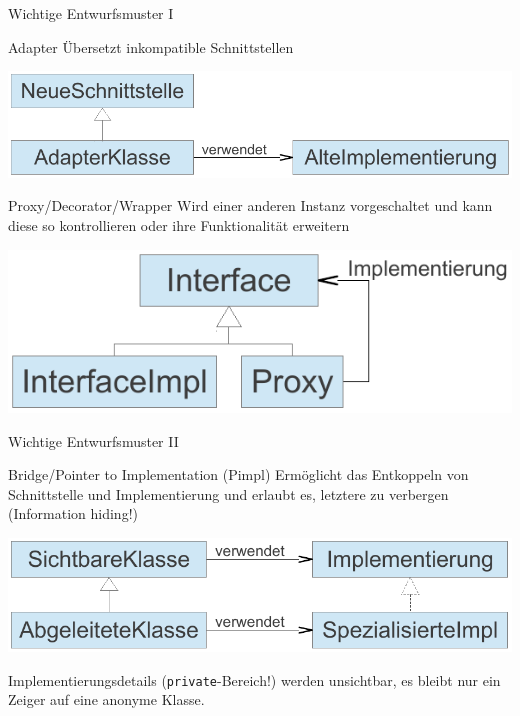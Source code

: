 \begin{frame}{Wichtige Entwurfsmuster I}
	\begin{block}{Adapter}
		Übersetzt inkompatible Schnittstellen
		\vspace{-0.7em}
		\begin{center}
			\includegraphics[width=0.85\linewidth]{images/adapter.pdf}
		\end{center}
	\end{block}
	
	\begin{block}{Proxy/Decorator/Wrapper}
		Wird einer anderen Instanz vorgeschaltet und kann diese so kontrollieren oder ihre Funktionalität erweitern		
		\vspace{-0.7em}
		\begin{center}
			\includegraphics[width=0.6\linewidth]{images/proxy.pdf}
		\end{center}
	\end{block}
\end{frame}
	
\begin{frame}{Wichtige Entwurfsmuster II}
	\begin{block}{Bridge/Pointer to Implementation (Pimpl)}
		Ermöglicht das Entkoppeln von Schnittstelle und Implementierung und erlaubt es, letztere zu verbergen (Information hiding!)
		\vspace{-0.7em}
		\begin{center}
			\includegraphics[width=0.85\linewidth]{images/bridge.pdf}
		\end{center}
		\vspace{-1em}
		Implementierungsdetails (\texttt{private}-Bereich!) werden unsichtbar, es bleibt nur ein Zeiger auf eine anonyme Klasse.
		\vspace{-0.5em}		
		
	\end{block}
\end{frame}
	

